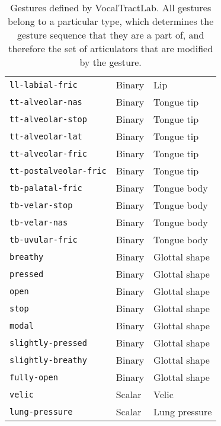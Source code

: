 \begin{table}[ht!]
\begin{scriptsize}
\begin{center}
\begin{tabular}{lll}
        \texttt{ll-labial-fric} & Binary & Lip \\
        \texttt{tt-alveolar-nas} & Binary & Tongue tip \\
        \texttt{tt-alveolar-stop} & Binary & Tongue tip \\
        \texttt{tt-alveolar-lat} & Binary & Tongue tip \\
        \texttt{tt-alveolar-fric} & Binary & Tongue tip \\
        \texttt{tt-postalveolar-fric} & Binary & Tongue tip \\
        \texttt{tb-palatal-fric} & Binary & Tongue body \\
        \texttt{tb-velar-stop} & Binary & Tongue body \\
        \texttt{tb-velar-nas} & Binary & Tongue body \\
        \texttt{tb-uvular-fric} & Binary & Tongue body \\
        \texttt{breathy} & Binary & Glottal shape \\
        \texttt{pressed} & Binary & Glottal shape \\
        \texttt{open} & Binary & Glottal shape \\
        \texttt{stop} & Binary & Glottal shape \\
        \texttt{modal} & Binary & Glottal shape \\
        \texttt{slightly-pressed} & Binary & Glottal shape \\
        \texttt{slightly-breathy} & Binary & Glottal shape \\
        \texttt{fully-open} & Binary & Glottal shape \\
        \texttt{velic} & Scalar & Velic \\
        \texttt{lung-pressure} & Scalar & Lung pressure \\
        \bottomrule
      \end{tabular}
    \end{center}
  \end{scriptsize}
  \renewcommand{\arraystretch}{1.0}
  \caption[VocalTractLab gestures.]{
    Gestures defined by VocalTractLab.
    All gestures belong to a particular type,
    which determines the gesture sequence that they are a part of,
    and therefore the set of articulators that are modified
    by the gesture.}
\label{tab:vtl-vtg}
\end{table}

